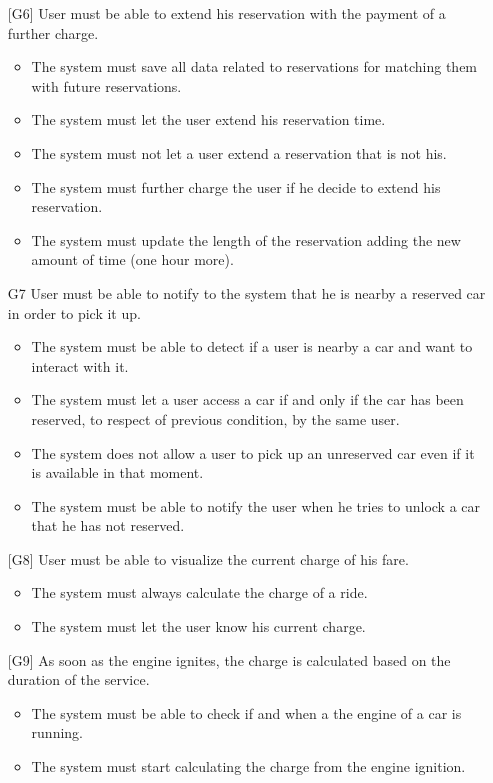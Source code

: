 \documentclass[10pt, a4paper,titlepage]{article}
\begin{document}
\begin{itemize}
\begin{itemize}
\end{itemize}
\item [{[G6]}] User must be able to extend his reservation with the payment of a further charge.
\begin{itemize}
\item The system must save all data related to reservations for matching them with future reservations.
\item The system must let the user extend his reservation time.
\item The system must not let a user extend a reservation that is not his.
\item The system must further charge the user if he decide to extend his reservation.
\item The system must update the length of the reservation adding the new amount of time (one hour more).
\end{itemize}
\item [{G7}] User must be able to notify to the system that he is nearby a reserved car in order to pick it up. 
\begin{itemize}
\item The system must be able to detect if a user is nearby a car and want to interact with it.
\item The system must let a user access a car if and only if the car has been reserved, to respect of previous condition, by the same user.
\item The system does not allow a user to pick up an unreserved car even if it is available in that moment.
\item The system must be able to notify the user when he tries to unlock a car that he has not reserved.
\end{itemize}
\item [{[G8]}] User must be able to visualize the current charge of his fare.
\begin{itemize}
\item The system must always calculate the charge of a ride.
\item The system must let the user know his current charge.
\end{itemize}
\item [{[G9]}] As soon as the engine ignites, the charge is calculated based on the duration of the service.
\begin{itemize}
\item The system must be able to check if and when a the engine of a car is running.
\item The system must start calculating the charge from the engine ignition.

\end{itemize}
\end{itemize}
\end{document}
